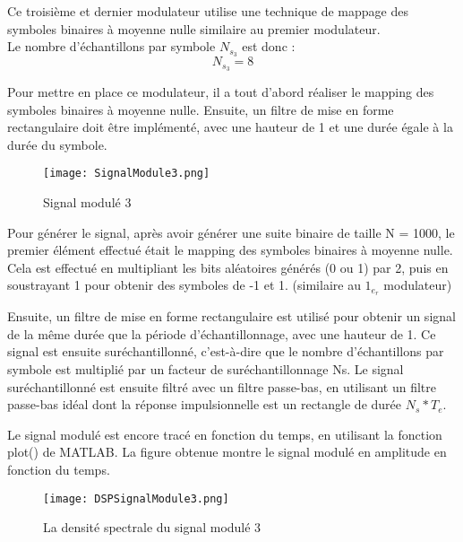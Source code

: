 \documentclass[11pt]{article}
\begin{document}
    Ce troisième et dernier modulateur utilise une technique de mappage des symboles binaires à moyenne nulle similaire au premier modulateur.\\
Le nombre d'échantillons par symbole $N_s_3$ est donc  :
$$N_s_3 = 8$$

Pour mettre en place ce modulateur, il a tout d'abord réaliser le mapping des symboles binaires à moyenne nulle. Ensuite, un filtre de mise en forme rectangulaire doit être implémenté, avec une hauteur de 1 et une durée égale à la durée du symbole.


\begin{figure}[ht!]
            \centering
            \texttt{[image: SignalModule3.png]}
            \caption{Signal modulé 3 \label{fig : SignalModule3}}
\end{figure}

Pour générer le signal, après avoir générer une suite binaire de taille N = 1000, le premier élément effectué était le mapping des symboles binaires à moyenne nulle. Cela est effectué en multipliant les bits aléatoires générés (0 ou 1) par 2, puis en soustrayant 1 pour obtenir des symboles de -1 et 1. (similaire au $1_e_r$ modulateur)

Ensuite, un filtre de mise en forme rectangulaire est utilisé pour obtenir un signal de la même durée que la période d'échantillonnage, avec une hauteur de 1. Ce signal est ensuite suréchantillonné, c'est-à-dire que le nombre d'échantillons par symbole est multiplié par un facteur de suréchantillonnage Ns. Le signal suréchantillonné est ensuite filtré avec un filtre passe-bas, en utilisant un filtre passe-bas idéal dont la réponse impulsionnelle est un rectangle de durée $N_s*T_e$.

Le signal modulé est encore tracé en fonction du temps, en utilisant la fonction plot() de MATLAB. La figure obtenue montre le signal modulé en amplitude en fonction du temps.

\begin{figure}[ht!]
            \centering
            \texttt{[image: DSPSignalModule3.png]}
            \caption{ La densité spectrale du signal modulé 3 \label{fig : DSPSignalModule3}}
\end{figure}
\end{document}
